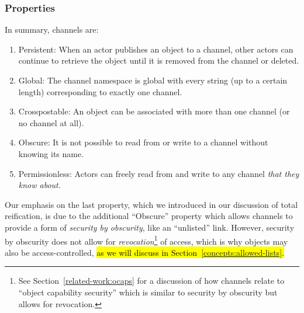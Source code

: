 





\subsubsection{Properties}

In summary, channels are:

\begin{enumerate}
\item
Persistent: When an actor publishes an object to a channel, other actors can
continue to retrieve the object until it is removed from the channel or deleted.
\item
Global: The channel namespace is global with every string (up to a certain length)
corresponding to exactly one channel.
\item
Crosspostable: An object can be associated with more than one channel (or no channel at all).
\item
Obscure: It is not possible to read from or write to a channel without knowing
its name.
\item
Permissionless: Actors can freely read from and write to any channel \emph{that they know about}.
\end{enumerate}

Our emphasis on the last property, which we introduced in our discussion of
total reification, is due to the additional ``Obscure'' property
which allows channels to provide a form of \emph{security by obscurity}, like an ``unlisted'' link.
However, security by obscurity does not allow for \emph{revocation}\footnote{
    See Section~\ref{related-work:ocaps} for a discussion of how channels relate to ``object capability security''
    which is similar to security by obscurity but allows for revocation.
}
of access,
which is why objects may also be access-controlled,
\hl{%
as we will discuss in Section~{\ref{concepts:allowed-lists}}.
}%

